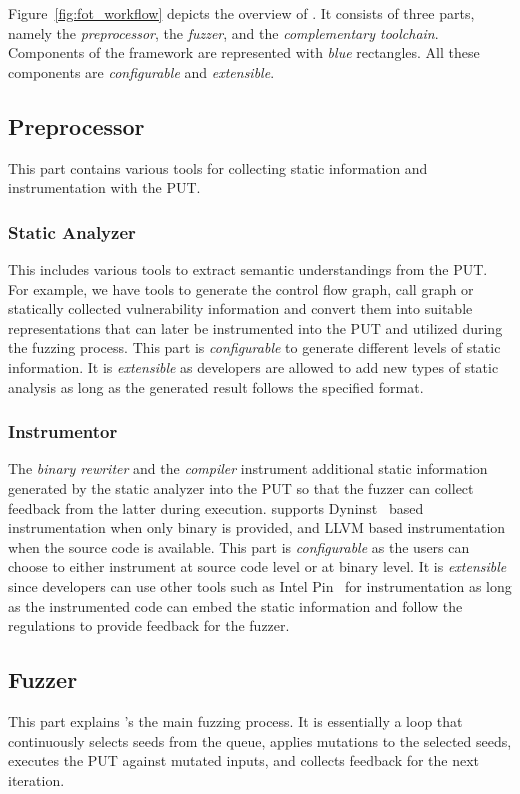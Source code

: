 Figure~\ref{fig:fot_workflow} depicts the overview of {\FOT}.
It consists of three parts, namely the \emph{preprocessor}, the \emph{fuzzer}, and the \emph{complementary toolchain}.
Components of the framework are represented with \emph{blue} rectangles. All these components are \textit{configurable} and \textit{extensible}.


\subsection{Preprocessor}
This part contains various tools for collecting static information and instrumentation with the PUT.


\subsubsection{Static Analyzer}\label{sec:static_analysis}
This includes various tools to extract semantic understandings from the PUT.
For example, we have tools to generate the control flow graph, call graph or statically collected vulnerability information and convert them into suitable representations that can later be instrumented into the PUT and utilized during the fuzzing process.
This part is \textit{configurable} to generate different levels of static information. It is \textit{extensible} as developers are allowed to add new types of static analysis as long as the generated result follows the specified format.


\subsubsection{Instrumentor}
The \emph{binary rewriter} and the \emph{compiler} instrument additional static information generated by the static analyzer into the PUT so that the fuzzer can collect feedback from the latter during execution.
{\FOT} supports Dyninst~\cite{dyninst} based instrumentation when only binary is provided, and LLVM based instrumentation when the source code is available.
This part is \textit{configurable} as the users can choose to either instrument at source code level or at binary level.
It is \textit{extensible} since developers can use other tools such as Intel Pin~\cite{pin} for instrumentation as long as the instrumented code can embed the static information and follow the regulations to provide feedback for the fuzzer.

\subsection{Fuzzer}
This part explains {\FOT}'s the main fuzzing process. 
It is essentially a loop that continuously selects seeds from the queue, applies mutations to the selected seeds, executes the PUT against mutated inputs, and collects feedback for the next iteration.

